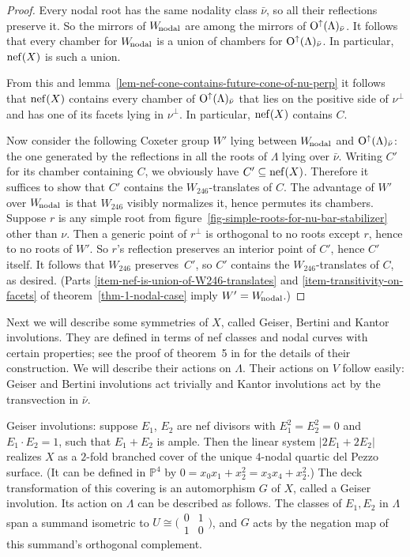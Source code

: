 \documentclass[12pt]{amsart}
\def\Wnodal{W_{\scriptstyle\rm\!nodal}}
\def\P{\mathbb{P}}
\def\nef{\mathop{\rm nef}\nolimits}
\def\Orth{{\rm O}}
\def\Oup{\Orth^{\uparrow}}
\def\nubar{{\bar{\nu}}}
\def\iso{\cong}
\def\sset{\subseteq}
\numberwithin{theorem}{section}
\numberwithin{equation}{section}
\numberwithin{figure}{section}
\theoremstyle{remark}
\begin{document}
\begin{proof}
  Every nodal root has the same
  nodality class $\nubar$, so all their reflections preserve it.  So the
  mirrors of $\Wnodal$ are among the mirrors of
  $\Oup(\Lambda)_\nubar$.  It follows that every chamber for
  $\Wnodal$
  is a union of chambers for
  $\Oup(\Lambda)_\nubar$.
  In particular, $\nef(X)$ is such a union.
  
  From this and lemma~\ref{lem-nef-cone-contains-future-cone-of-nu-perp} it follows that
  $\nef(X)$ contains every chamber of $\Oup(\Lambda)_\nubar$ that lies
  on the positive side of $\nu^\perp$ and has one of its facets lying
  in $\nu^\perp$.  In particular, $\nef(X)$ contains $C$.

  Now consider the following Coxeter group $W'$ lying between
  $\Wnodal$ and $\Oup(\Lambda)_\nubar$: the one generated by the
  reflections in all the roots of $\Lambda$ lying over $\nubar$.
  Writing $C'$ for its chamber containing $C$, we obviously have
  $C'\sset\nef(X)$.  Therefore it suffices to show that $C'$ contains
  the $W_{246}$-translates of $C$.  The advantage of $W'$ over
  $\Wnodal$ is that $W_{246}$ visibly normalizes it, hence permutes
  its chambers.  Suppose $r$ is any simple root from
  figure~\ref{fig-simple-roots-for-nu-bar-stabilizer} other than
  $\nu$.  Then a generic point of $r^\perp$ is orthogonal to no roots
  except $r$, hence to no roots of $W'$.  So $r$'s reflection
  preserves an interior point of $C'$, hence $C'$ itself.  It follows
  that $W_{246}$ preserves~$C'$, so $C'$ contains the
  $W_{246}$-translates of $C$, as desired.  (Parts \eqref{item-nef-is-union-of-W246-translates} and
  \eqref{item-transitivity-on-facets} of theorem~\ref{thm-1-nodal-case} imply $W'=\Wnodal$.)
\end{proof}

Next we will describe some symmetries of $X$, called Geiser, Bertini
and Kantor involutions.  They are defined in terms of nef
classes and nodal curves with certain properties; see the proof of
theorem~5 in \cite{Dolgachev-introduction-to-Enriques-surfaces} for
the details of
their construction.  We will describe their actions on $\Lambda$.  Their
actions on $V$ follow easily: Geiser and Bertini involutions act
trivially and Kantor involutions act by the transvection in
$\nubar$.

Geiser involutions: suppose $E_1$, $E_2$ are nef divisors with
$E_1^2=E_2^2=0$ and $E_1\cdot E_2=1$, such that $E_1+E_2$ is ample.
Then the linear system $|2E_1+2E_2|$ realizes $X$ as a $2$-fold
branched cover of the unique $4$-nodal quartic del Pezzo surface.  (It
can be defined in $\P^4$ by $0=x_0x_1 +x_2^2 = x_3x_4 +x_2^2$.)  The
deck transformation of this covering is an automorphism $G$ of $X$,
called a Geiser involution.  Its action on $\Lambda$ can be described
as follows.  The classes of $E_1,E_2$ in $\Lambda$ span a summand
isometric to
$U\iso\bigl(\begin{smallmatrix}0&1\\1&0\end{smallmatrix}\bigr)$, and
  $G$ acts by the negation map of this summand's orthogonal
  complement.
\end{document}
